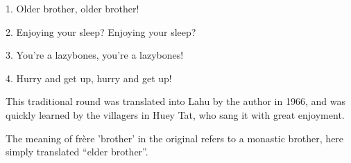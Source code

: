 \setcounter{footnote}{0}

1. Older brother, older brother!

2. Enjoying your sleep? Enjoying your sleep?

3. You're a lazybones, you're a lazybones!

4. Hurry and get up, hurry and get up!

This traditional round was translated into Lahu by the author in 1966, and was
quickly learned by the villagers in Huey Tat, who sang it with great enjoyment.

The meaning of frère 'brother' in the original refers to a monastic brother, here
simply translated ``elder brother''.

